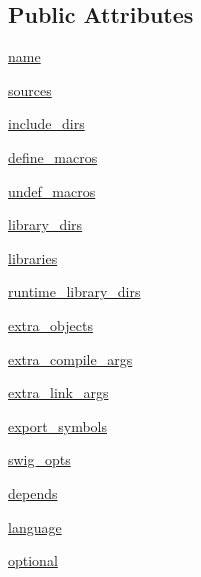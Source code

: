 \subsection*{Public Attributes}
\begin{DoxyCompactItemize}
\item 
\hyperlink{classsetuptools_1_1__distutils_1_1extension_1_1Extension_a91644a6101da93d158002781bef307c6}{name}
\item 
\hyperlink{classsetuptools_1_1__distutils_1_1extension_1_1Extension_a7dda92c3a0744e7d6c8555748ce2db09}{sources}
\item 
\hyperlink{classsetuptools_1_1__distutils_1_1extension_1_1Extension_ae19b915384434d6cb0c96a999b5d40c0}{include\+\_\+dirs}
\item 
\hyperlink{classsetuptools_1_1__distutils_1_1extension_1_1Extension_acaa46c0f6787c347d69b1c9269a45474}{define\+\_\+macros}
\item 
\hyperlink{classsetuptools_1_1__distutils_1_1extension_1_1Extension_a8b95c2b363310e2394cb00325d9eb316}{undef\+\_\+macros}
\item 
\hyperlink{classsetuptools_1_1__distutils_1_1extension_1_1Extension_a93d40c6abbf2ac8d0fc38853294d5a56}{library\+\_\+dirs}
\item 
\hyperlink{classsetuptools_1_1__distutils_1_1extension_1_1Extension_a9514a67b35016fd344b765a0af3fc89e}{libraries}
\item 
\hyperlink{classsetuptools_1_1__distutils_1_1extension_1_1Extension_ae9802c6e9cb10ae2f98b6e6a4cc2c113}{runtime\+\_\+library\+\_\+dirs}
\item 
\hyperlink{classsetuptools_1_1__distutils_1_1extension_1_1Extension_a90b62ab18abc7ff1c3e6805df2495874}{extra\+\_\+objects}
\item 
\hyperlink{classsetuptools_1_1__distutils_1_1extension_1_1Extension_a9ce689aadadfa37187278fba269bc675}{extra\+\_\+compile\+\_\+args}
\item 
\hyperlink{classsetuptools_1_1__distutils_1_1extension_1_1Extension_a6e2256988f4cc2989e6f904f36884e1b}{extra\+\_\+link\+\_\+args}
\item 
\hyperlink{classsetuptools_1_1__distutils_1_1extension_1_1Extension_a646e18a5dd35cc6043c3c977b6d85d31}{export\+\_\+symbols}
\item 
\hyperlink{classsetuptools_1_1__distutils_1_1extension_1_1Extension_ad5d2384da1b82b387af8c04e16cdd22a}{swig\+\_\+opts}
\item 
\hyperlink{classsetuptools_1_1__distutils_1_1extension_1_1Extension_a6da640830d64f0b9048dc290efe5f833}{depends}
\item 
\hyperlink{classsetuptools_1_1__distutils_1_1extension_1_1Extension_a705d32bd45c9452d94ceb9d27d7be534}{language}
\item 
\hyperlink{classsetuptools_1_1__distutils_1_1extension_1_1Extension_aaa136ebcd9b26fcd8869d2ae82b77f1d}{optional}
\end{DoxyCompactItemize}


